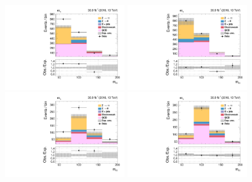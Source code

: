 \begin{figure}[h]
    \centering
  {\includegraphics[width=0.47\textwidth]{Figures/background_estimation/RQCDOSSS/Postfit/et_ZeroJet2D_antiiso_near/prefit_et_ZeroJet2D_antiiso_near.pdf}}
  {\includegraphics[width=0.47\textwidth]{Figures/background_estimation/RQCDOSSS/Postfit/et_ZeroJet2D_antiiso_near/postfit_et_ZeroJet2D_antiiso_near.pdf}} \\ 
  {\includegraphics[width=0.47\textwidth]{Figures/background_estimation/RQCDOSSS/Postfit/et_Boosted2D_antiiso_near/prefit_et_Boosted2D_antiiso_near.pdf}}
  {\includegraphics[width=0.47\textwidth]{Figures/background_estimation/RQCDOSSS/Postfit/et_Boosted2D_antiiso_near/postfit_et_Boosted2D_antiiso_near.pdf}} \\

\end{figure}
